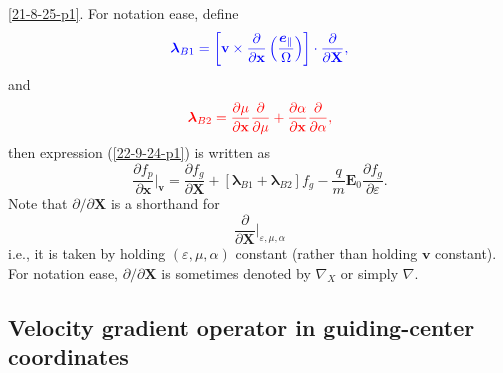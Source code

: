 \documentclass{article}
\newcommand{\nobracket}{}
\newcommand{\tmcolor}[2]{{\color{#1}{#2}}}
\newcommand{\tmmathbf}[1]{\ensuremath{\boldsymbol{#1}}}
\begin{document}
\ref{21-8-25-p1}. For notation ease, define
\begin{equation}
  \label{18-9-16-1} \tmcolor{blue}{\tmmathbf{\lambda}_{B 1} = \left[
  \mathbf{v} \times \frac{\partial}{\partial \mathbf{x}} \left(
  \frac{\tmmathbf{e}_{\parallel}}{\Omega} \right) \right] \cdot
  \frac{\partial}{\partial \mathbf{X}},}
\end{equation}
and
\begin{equation}
  \label{18-9-16-2} \tmcolor{red}{\tmmathbf{\lambda}_{B 2} = \frac{\partial
  \mu}{\partial \mathbf{x}}  \frac{\partial}{\partial \mu} + \frac{\partial
  \alpha}{\partial \mathbf{x}}  \frac{\partial}{\partial \alpha},}
\end{equation}
then expression (\ref{22-9-24-p1}) is written as
\begin{equation}
  \label{17-9-2-p1} \frac{\partial f_p}{\partial \mathbf{x}} |_{\mathbf{v}}
  \nobracket = \frac{\partial f_g}{\partial \mathbf{X}} +
  [\tmmathbf{\lambda}_{B 1} +\tmmathbf{\lambda}_{B 2}] f_g - \frac{q}{m}
  \mathbf{E}_0 \frac{\partial f_g}{\partial \varepsilon} .
\end{equation}
Note that $\partial / \partial \mathbf{X}$ is a shorthand for
\[ \frac{\partial}{\partial \mathbf{X}} |_{\varepsilon, \mu, \alpha}
   \nobracket \]
i.e., it is taken by holding $(\varepsilon, \mu, \alpha)$ constant (rather
than holding $\mathbf{v}$ constant). For notation ease, $\partial / \partial
\mathbf{X}$ is sometimes denoted by $\nabla_X$ or simply $\nabla$.

\subsection{Velocity gradient operator in guiding-center coordinates}
\end{document}
